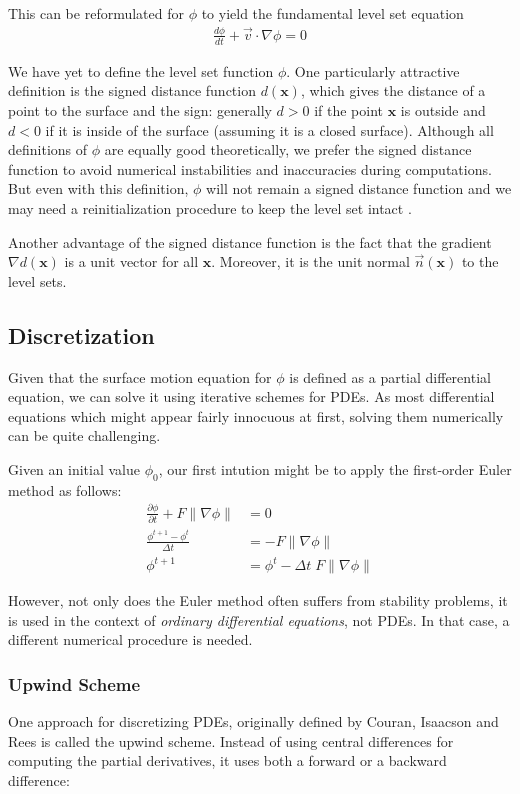 \documentclass{article}
\begin{document}
This can be reformulated for $\phi$ to yield the fundamental level set
equation
\begin{align}
  \frac{d \phi}{dt} + \vec{v} \cdot \nabla \phi = 0
\end{align}

We have yet to define the level set function $\phi$. One particularly
attractive definition is the signed distance function $d(\mathbf{x})$, which
gives the distance of a point to the surface and the sign: generally $d > 0$
if the point $\mathbf{x}$ is outside and $d < 0$ if it is inside of the
surface (assuming it is a closed surface). Although all definitions of $\phi$
are equally good theoretically, we prefer the signed distance function to
avoid numerical instabilities and inaccuracies during computations. But even
with this definition, $\phi$ will not remain a signed distance function and we
may need a reinitialization procedure to keep the level set intact
\cite{peng1999pde}.

Another advantage of the signed distance function is the fact that the
gradient $\nabla d(\mathbf{x})$ is a unit vector for all
$\mathbf{x}$. Moreover, it is the unit normal $\vec{n}(\mathbf{x})$ to the
level sets.

\subsection{Discretization}

Given that the surface motion equation for $\phi$ is defined as a partial
differential equation, we can solve it using iterative schemes for PDEs. As most
differential equations which might appear fairly innocuous at first, solving
them numerically can be quite challenging.

Given an initial value $\phi_0$, our first intution might be to apply the
first-order Euler method as follows:
\begin{align}
  \frac{\partial \phi}{\partial t} + F \|\nabla \phi\| &= 0 \\
  \frac{\phi^{t+1} - \phi^{t}}{\Delta t} &=  -F \|\nabla \phi\| \\
  \phi^{t+1} &= \phi^{t} - \Delta t \; F \|\nabla \phi\| 
\end{align}

However, not only does the Euler method often suffers from stability problems,
it is used in the context of \textit{ordinary differential equations}, not PDEs.
In that case, a different numerical procedure is needed. 

\subsubsection{Upwind Scheme}
One approach for discretizing PDEs, originally defined by Couran, Isaacson and
Rees \cite{courant1952solution} is called the upwind scheme. Instead of using
central differences for computing the partial derivatives, it uses both a
forward or a backward difference:
\end{document}
